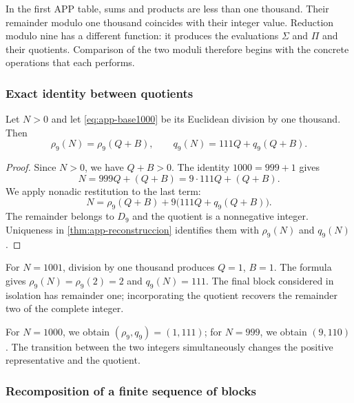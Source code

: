 In the first APP table, sums and products are less than one thousand. Their remainder modulo one thousand coincides with their integer value. Reduction modulo nine has a different function: it produces the evaluations $\Sigma$ and $\Pi$ and their quotients. Comparison of the two moduli therefore begins with the concrete operations that each performs.

\subsubsection{Exact identity between quotients}

\begin{bloqueindivisible}
\begin{teorema}
\label{thm:app-compatibilidad-mil}
Let $N>0$ and let \eqref{eq:app-base1000} be its Euclidean division by one thousand. Then
\begin{equation}
 \rho_9(N)=\rho_9(Q+B),\qquad
 q_9(N)=111Q+q_9(Q+B).
 \label{eq:app-cross-module}
\end{equation}
\end{teorema}

\begin{proof}
Since $N>0$, we have $Q+B>0$. The identity $1000=999+1$ gives
\[
 N=999Q+(Q+B)=9\cdot111Q+(Q+B).
\]
We apply nonadic restitution to the last term:
\[
 N=\rho_9(Q+B)+9\bigl(111Q+q_9(Q+B)\bigr).
\]
The remainder belongs to $D_9$ and the quotient is a nonnegative integer. Uniqueness in \cref{thm:app-reconstruccion} identifies them with $\rho_9(N)$ and $q_9(N)$.
\end{proof}
\end{bloqueindivisible}

\begin{ejemplo}
For $N=1001$, division by one thousand produces $Q=1$, $B=1$. The formula gives $\rho_9(N)=\rho_9(2)=2$ and $q_9(N)=111$. The final block considered in isolation has remainder one; incorporating the quotient recovers the remainder two of the complete integer.

For $N=1000$, we obtain $(\rho_9,q_9)=(1,111)$; for $N=999$, we obtain $(9,110)$. The transition between the two integers simultaneously changes the positive representative and the quotient.
\end{ejemplo}

\subsubsection{Recomposition of a finite sequence of blocks}


